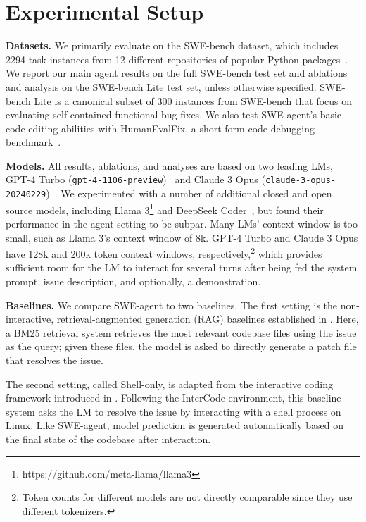 \section{Experimental Setup}
\label{sec:experiments}
\textbf{Datasets.}
We primarily evaluate on the SWE-bench dataset, which includes \num{2294} task instances from \num{12} different repositories of popular Python packages~\citep{jimenez2024swebench}.
We report our main agent results on the full SWE-bench test set and ablations and analysis on the SWE-bench Lite test set, unless otherwise specified.
SWE-bench Lite is a canonical subset of \num{300} instances from SWE-bench that focus on evaluating self-contained functional bug fixes.
We also test SWE-agent's basic code editing abilities with HumanEvalFix, a short-form code debugging benchmark~\citep{muennighoff2023octopack}.

\textbf{Models.}
All results, ablations, and analyses are based on two leading LMs, GPT-4 Turbo (\texttt{gpt-4-1106-preview})~\citep{openai2023gpt4} and Claude 3 Opus (\texttt{claude-3-opus-20240229})~\citep{chiang2024chatbot}.
We experimented with a number of additional closed and open source models, including Llama 3\footnote{https://github.com/meta-llama/llama3} and DeepSeek Coder~\citep{deepseek-coder}, but found their performance in the agent setting to be subpar.
Many LMs' context window is too small, such as Llama 3's context window of \num{8}k.
GPT-4 Turbo and Claude 3 Opus have \num{128}k and \num{200}k token context windows, respectively,\footnote{Token counts for different models are not directly comparable since they use different tokenizers.} which provides sufficient room for the LM to interact for several turns after being fed the system prompt, issue description, and optionally, a demonstration.

\textbf{Baselines.}
We compare SWE-agent to two baselines.
The first setting is the non-interactive, retrieval-augmented generation (RAG) baselines established in \citet{jimenez2024swebench}.
Here, a BM25 retrieval system retrieves the most relevant codebase files using the issue as the query; given these files, the model is asked to directly generate a patch file that resolves the issue.

The second setting, called Shell-only, is adapted from the interactive coding framework introduced in \citet{yang2023intercode}.
Following the InterCode environment, this baseline system asks the LM to resolve the issue by interacting with a shell process on Linux.
Like SWE-agent, model prediction is generated automatically based on the final state of the codebase after interaction.

